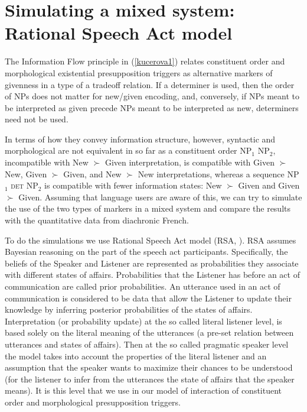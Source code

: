 \documentclass[output=paper,modfonts,nonflat]{langsci/langscibook}
\begin{document}


\section{Simulating a mixed system: Rational Speech Act model}
\label{section:rsa}

The Information Flow principle in (\ref{kucerova1}) relates constituent order and morphological existential presupposition triggers as alternative markers of givenness in a type of a tradeoff relation. If a determiner is used, then the order of NPs does not matter for new/given encoding, and, conversely, if NPs meant to be interpreted as given precede NPs meant to be interpreted as new, determiners need not be used. 

In terms of how they convey information structure, however, syntactic and morphological are not equivalent in so far as a constituent order NP$_{1}$ NP$_{2}$, incompatible with New $\succ$ Given interpretation, is compatible with Given $\succ$ New, Given $\succ$ Given, and New $\succ$ New interpretations, whereas a sequence NP$_{1}$ {\scshape det} NP$_{2}$ is compatible with fewer information states: New $\succ$ Given and Given $\succ$ Given. Assuming that language users are aware of this, we can try to simulate the use of the two types of markers in a mixed system and compare the results with the quantitative data from diachronic French.

To do the simulations we use Rational Speech Act model (RSA, \citet{FrankGoodman:2012}). RSA assumes Bayesian reasoning on the part of the speech act participants. Specifically, the beliefs of the Speaker and Listener are represented as probabilities they associate with different states of affairs. Probabilities that the Listener has before an act of communication are called prior probabilities. An utterance used in an act of communication is considered to be data that allow the Listener to update their knowledge by inferring posterior probabilities of the states of affairs. Interpretation (or probability update) at the so called literal listener level, is based solely on the literal meaning of the utterances (a pre-set relation between utterances and states of affairs). Then at the so called pragmatic speaker level the model takes into account the properties of the literal listener and an assumption that the speaker wants to maximize their chances to be understood (for the listener to infer from the utterances the state of affairs that the speaker means). It is this level that we use in our model of interaction of constituent order and morphological presupposition triggers.
\end{document}
